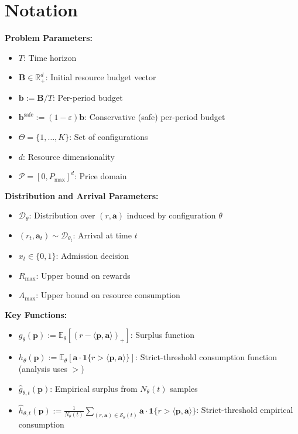 \documentclass[11pt]{article}
\newcommand{\bB}{\mathbf{B}}
\newcommand{\bb}{\mathbf{b}}
\newcommand{\bbS}{\mathbf{b}^{\mathrm{safe}}}
\newcommand{\ba}{\mathbf{a}}
\newcommand{\bp}{\mathbf{p}}
\newcommand{\E}{\mathbb{E}}
\newcommand{\R}{\mathbb{R}}
\newcommand{\cP}{\mathcal{P}}
\newcommand{\cD}{\mathcal{D}}
\newcommand{\cS}{\mathcal{S}}
\begin{document}
\newpage

\appendix

\section{Notation}
\label{app:notation}

\textbf{Problem Parameters:}
\begin{itemize}
    \item $T$: Time horizon
    \item $\bB \in \R^d_+$: Initial resource budget vector
    \item $\bb := \bB/T$: Per-period budget
    \item $\bbS := (1-\varepsilon)\bb$: Conservative (safe) per-period budget
    \item $\Theta = \{1, \ldots, K\}$: Set of configurations
    \item $d$: Resource dimensionality
    \item $\cP = [0, P_{\max}]^d$: Price domain
\end{itemize}

\textbf{Distribution and Arrival Parameters:}
\begin{itemize}
    \item $\cD_\theta$: Distribution over $(r, \ba)$ induced by configuration $\theta$
    \item $(r_t, \ba_t) \sim \cD_{\theta_t}$: Arrival at time $t$
    \item $x_t \in \{0, 1\}$: Admission decision
    \item $R_{\max}$: Upper bound on rewards
    \item $A_{\max}$: Upper bound on resource consumption
\end{itemize}

\textbf{Key Functions:}
\begin{itemize}
    \item $g_\theta(\bp) := \E_\theta[(r - \langle \bp, \ba \rangle)_+]$: Surplus function
    \item $h_\theta(\bp) := \E_\theta[\ba \cdot \mathbf{1}\{r > \langle \bp, \ba \rangle\}]$: Strict-threshold consumption function (analysis uses $>$)
    \item $\widehat{g}_{\theta,t}(\bp)$: Empirical surplus from $N_\theta(t)$ samples
    \item $\widehat{h}_{\theta,t}(\bp) := \frac{1}{N_\theta(t)} \sum_{(r,\ba) \in \cS_\theta(t)} \ba \cdot \mathbf{1}\{r > \langle \bp, \ba \rangle\}$: Strict-threshold empirical consumption
\end{itemize}
\end{document}
